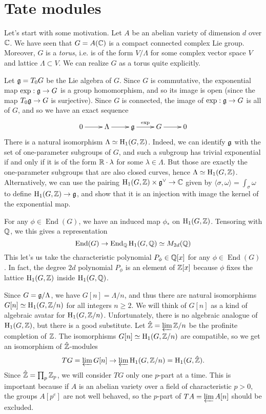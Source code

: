 \documentclass{article}
\begin{document}
\section{Tate modules}

Let's start with some motivation. Let $A$ be an abelian variety of dimension 
$d$ over $\mathbb{C}$. We have seen that $G=A(\mathbb{C})$ is a compact connected complex Lie 
group. Moreover, $G$ is a \emph{torus}, i.e. is of the form $V/\Lambda$ for 
some complex vector space $V$ and lattice $\Lambda\subset V$. We can realize 
$G$ as a torus quite explicitly. 

Let $\mathfrak{g}=T_0 G$ be the Lie algebra of $G$. Since $G$ is commutative, the 
exponential map $\exp:\mathfrak{g}\to G$ is a group homomorphism, and so its image is 
open (since the map $T_0 \mathfrak{g}\to G$ is surjective). Since $G$ is connected, 
the image of $\exp:\mathfrak{g}\to G$ is all of $G$, and so we have an exact sequence 
\[\xymatrix{
  0 \ar[r] 
    & \Lambda \ar[r] 
    & \fg \ar[r]^-{\exp} 
    & G \ar[r] 
    & 0
}\]
There is a natural isomorphism $\Lambda\simeq \operatorname{H}_1(G,\mathbb{Z})$. Indeed, we can 
identify $\mathfrak{g}$ with the set of one-parameter subgroups of $G$, and such a 
subgroup has trivial exponential if and only if it is of the form 
$\mathbb{R}\cdot \lambda$ for some $\lambda\in\Lambda$. But those are exactly the 
one-parameter subgroups that are also closed curves, hence 
$\Lambda\simeq \operatorname{H}_1(G,\mathbb{Z})$. Alternatively, we can use the pairing 
$\operatorname{H}_1(G,\mathbb{Z})\times \mathfrak{g}^\vee\to \mathbb{C}$ given by 
$\langle \sigma,\omega\rangle=\int_\sigma\omega$ to define 
$\operatorname{H}_1(G,\mathbb{Z})\to \mathfrak{g}$, and show that it is an injection with image the kernel 
of the exponential map. 

For any $\phi\in \operatorname{End}(G)$, we have an induced map $\phi_\ast$ on 
$\operatorname{H}_1(G,\mathbb{Z})$. Tensoring with $\mathbb{Q}$, we this gives a representation 
\[
  \operatorname{End}(G) \to \operatorname{End}_{\mathbb{Q}}{\operatorname{H}_1(G,\mathbb{Q})} \simeq M_{2 d}(\mathbb{Q})
\]
This let's us take the characteristic polynomial $P_\phi\in \mathbb{Q}[x]$ for any 
$\phi\in \operatorname{End}(G)$. In fact, the degree $2 d$ polynomial 
$P_\phi$ is an element of $\mathbb{Z}[x]$ because $\phi$ fixes the lattice 
$\operatorname{H}_1(G,\mathbb{Z})$ inside $\operatorname{H}_1(G,\mathbb{Q})$. 

Since $G=\mathfrak{g}/\Lambda$, we have $G[n]=\Lambda/n$, and thus there are natural 
isomorphisms $G[n]\simeq \operatorname{H}_1(G,\mathbb{Z}/n)$ for all integers $n\geqslant 2$. 
We will think of $G[n]$ as a kind of algebraic avatar for $\operatorname{H}_1(G,\mathbb{Z}/n)$. 
Unfortunately, there is no algebraic analogue of $\operatorname{H}_1(G,\mathbb{Z})$, but there is a 
good substitute. Let $\hat{\mathbb{Z}}=\varprojlim \mathbb{Z}/n$ be the profinite completion of 
$\mathbb{Z}$. The isomorphisms $G[n]\simeq \operatorname{H}_1(G,\mathbb{Z}/n)$ are compatible, so we get an 
isomorphism of $\hat{\mathbb{Z}}$-modules 
\[
  T G = \varprojlim G[n] \to \varprojlim \operatorname{H}_1(G,\mathbb{Z}/n) = \operatorname{H}_1(G,\hat{\mathbb{Z}}) \text{.}
\]
Since $\hat{\mathbb{Z}}=\prod_p \mathbb{Z}_p$, we will consider $T G$ only one $p$-part at 
a time. This is important because if $A$ is an abelian variety over a field of 
characteristic $p>0$, the groups $A[p^e]$ are not well behaved, so the 
$p$-part of $T A=\varprojlim A[n]$ should be excluded. 
\end{document}

